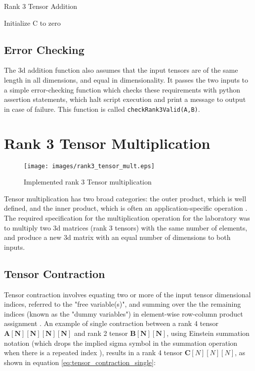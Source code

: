 \documentclass[10 pt, conference]{cssconf}
\begin{document}
\begin{algorithm}[ht] \small
\caption{Rank 3 Tensor Addition}\label{pc:rank3_add}
    	 \SetAlgoLined
	Initialize C to zero\;
\end{algorithm} %


\subsection{Error Checking}
The 3d addition function also assumes that the input tensors are of the same length in all dimensions, and equal in dimensionality. It passes the two inputs to a simple error-checking function which checks these requirements with python assertion statements, which halt script execution and print a message to output in case of failure. This function is called \verb|checkRank3Valid(A,B)|.
\section{Rank 3 Tensor Multiplication}

\begin{figure}[ht] \centering 
    \vspace*{-5pt}
    \small{\texttt{[image: images/rank3\_tensor\_mult.eps]}}
    \small\caption{Implemented rank 3 Tensor multiplication}
    \label{fig:tensor_product} 
\end{figure}%

Tensor multiplication has two broad categories: the outer product, which is well defined, and the inner product, which  is often an application-specific operation \cite{sringeri2015tensor}. The required specification for the multiplication operation for the laboratory was to multiply two 3d matrices (rank 3 tensors) with the same number of elements, and produce a new 3d matrix with an equal number of dimensions to both inputs.

\subsection{Tensor Contraction}
Tensor contraction involves equating two or more of the input tensor dimensional indices, referred to the "free variable(s)", and summing over the the remaining indices (known as the "dummy variables") in element-wise row-column product assignment \cite{hackbusch2012tensor}. An example of single contraction between a rank 4 tensor $\mathbf{A[N][N][N][N]}$ and rank 2 tensor $\mathbf{B[N][N]}$, using Einstein summation notation (which drops the implied sigma symbol in the summation operation when there is a repeated index \cite{Hunt-notes}), results in a rank 4 tensor $\mathbf{C}[N][N][N]$, as shown in equation \ref{eq:tensor_contraction_single}:
\end{document}
